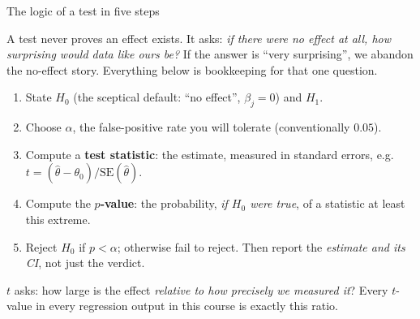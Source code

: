 \documentclass[aspectratio=169,11pt]{beamer}
\begin{document}
\begin{frame}{The logic of a test in five steps}
  \footnotesize
  \begin{readme}
    A test never proves an effect exists. It asks: \emph{if there were no
    effect at all, how surprising would data like ours be?} If the answer is
    ``very surprising'', we abandon the no-effect story. Everything below is
    bookkeeping for that one question.
  \end{readme}
  \begin{enumerate}
    \item State $H_0$ (the sceptical default: ``no effect'', $\beta_j = 0$)
          and $H_1$.
    \item Choose $\alpha$, the false-positive rate you will tolerate
          (conventionally $0.05$).
    \item Compute a \textbf{test statistic}: the estimate, measured in
          standard errors, e.g.\ $t = (\hat\theta - \theta_0)/\mathrm{SE}(\hat\theta)$.
    \item Compute the \textbf{$p$-value}: the probability, \emph{if $H_0$ were
          true}, of a statistic at least this extreme.
    \item Reject $H_0$ if $p < \alpha$; otherwise fail to reject. Then report
          the \emph{estimate and its CI}, not just the verdict.
  \end{enumerate}
  \begin{takeaway}
    $t$ asks: how large is the effect \emph{relative to how precisely we
    measured it}? Every $t$-value in every regression output in this course
    is exactly this ratio.
  \end{takeaway}
\end{frame}
\end{document}
